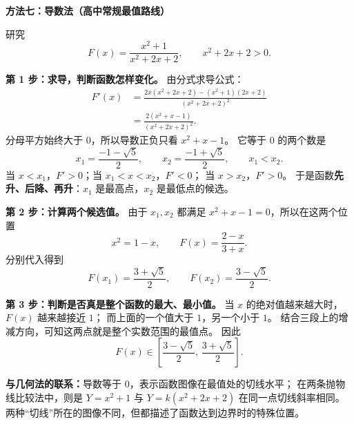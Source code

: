 \clearpage
\begin{proofbox}
\textbf{\textcolor{CProof}{方法七：导数法（高中常规最值路线）}}

研究
\[
 F(x)=\frac{x^2+1}{x^2+2x+2},\qquad x^2+2x+2>0.
\]

\textbf{第 1 步：求导，判断函数怎样变化。}
由分式求导公式：
\[
 \begin{aligned}
 F'(x)
 &=\frac{2x(x^2+2x+2)-(x^2+1)(2x+2)}{(x^2+2x+2)^2}\\
 &=\boxed{\frac{2(x^2+x-1)}{(x^2+2x+2)^2}}.
 \end{aligned}
\]
分母平方始终大于 $0$，所以导数正负只看 $x^2+x-1$。
它等于 $0$ 的两个数是
\[
  x_1=\frac{-1-\sqrt5}{2},\qquad x_2=\frac{-1+\sqrt5}{2},\qquad x_1<x_2.
\]
当 $x<x_1$，$F'>0$；当 $x_1<x<x_2$，$F'<0$；
当 $x>x_2$，$F'>0$。
于是函数\textbf{先升、后降、再升}：$x_1$ 是最高点，$x_2$ 是最低点的候选。

\textbf{第 2 步：计算两个候选值。}
由于 $x_1,x_2$ 都满足 $x^2+x-1=0$，所以在这两个位置
\[
 x^2=1-x,\qquad
 F(x)=\frac{2-x}{3+x}.
\]
分别代入得到
\[
  F(x_1)=\frac{3+\sqrt5}{2},\qquad
  F(x_2)=\frac{3-\sqrt5}{2}.
\]

\textbf{第 3 步：判断是否真是整个函数的最大、最小值。}
当 $x$ 的绝对值越来越大时，$F(x)$ 越来越接近 $1$；
而上面的一个值大于 $1$，另一个小于 $1$。
结合三段上的增减方向，可知这两点就是整个实数范围的最值点。
因此
\[
  \boxed{F(x)\in\left[\frac{3-\sqrt5}{2},\,\frac{3+\sqrt5}{2}\right].}
\]

\textbf{与几何法的联系：}导数等于 $0$，表示函数图像在最值处的切线水平；
在两条抛物线比较法中，则是 $Y=x^2+1$ 与 $Y=k(x^2+2x+2)$ 在同一点切线斜率相同。
两种“切线”所在的图像不同，但都描述了函数达到边界时的特殊位置。
\end{proofbox}
